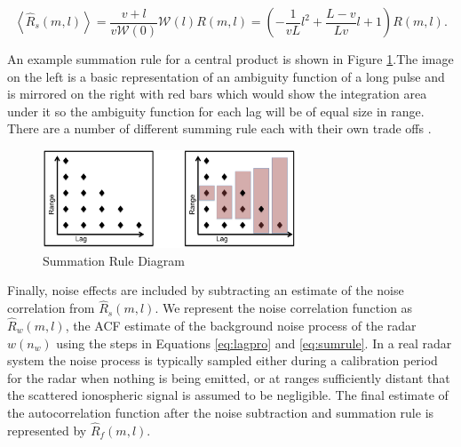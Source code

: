 \begin{equation}
\label{eq:sumruleest}
\left\langle\widehat{R}_s(m,l) \right\rangle  =\frac{v+l}{v\mathcal{W}(0)}\mathcal{W}(l)R(m,l) =\left(-\frac{1}{vL}l^2+\frac{L-v}{Lv}l+1\right)   R(m,l).
\end{equation}

An example summation rule for a central product is shown in Figure \ref{fig:sumrule}.The image on the left is a basic representation of an ambiguity function of a long pulse and is mirrored on the right with red bars which would show the integration area under it so the ambiguity function for each lag will be of equal size in range. There are a number of different summing rule each with their own trade offs \cite{nygren1996}.

\begin{figure}[!t]
\centering
\includegraphics[width=3in]{sumrule}
\caption{Summation Rule Diagram}
\label{fig:sumrule}
\end{figure}





Finally, noise effects are included by subtracting an estimate of the noise correlation from $\widehat{R}_s(m,l)$.  We represent the noise correlation function as $\widehat{R}_w(m,l)$, the ACF estimate of the background noise process of the radar $w(n_w)$ using the steps in Equations \ref{eq:lagpro} and \ref{eq:sumrule}. In a real radar system the noise process is typically sampled either during a calibration period for the radar when nothing is being emitted, or at ranges sufficiently distant that the scattered ionospheric signal is assumed to be negligible. The final estimate of the autocorrelation function after the noise subtraction and summation rule is represented by $\widehat{R}_f(m,l)$.

